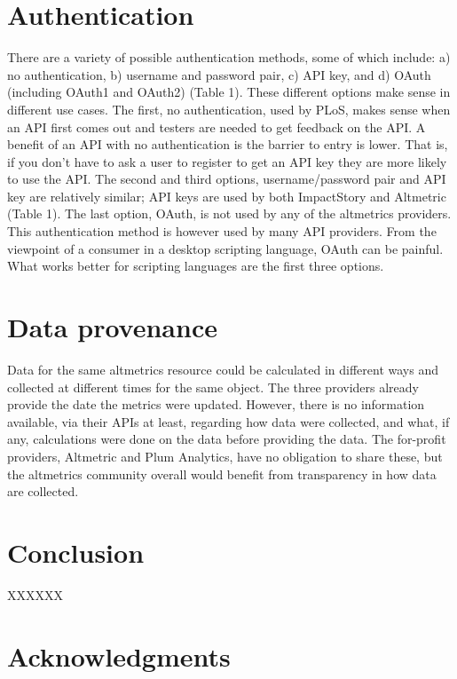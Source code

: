 \documentclass[letterpaper,superscriptaddress,showkeys,longbibliography]{revtex4-1}\usepackage{graphicx, color}
\begin{document}
\section{Authentication}

There are a variety of possible authentication methods, some of which include: a) no authentication, b) username and password pair, c) API key, and d) OAuth (including OAuth1 and OAuth2) (Table 1). These different options make sense in different use cases. The first, no authentication, used by PLoS, makes sense when an API first comes out and testers are needed to get feedback on the API. A benefit of an API with no authentication is the barrier to entry is lower. That is, if you don't have to ask a user to register to get an API key they are more likely to use the API. The second and third options, username/password pair and API key are relatively similar; API keys are used by both ImpactStory and Altmetric (Table 1). The last option, OAuth, is not used by any of the altmetrics providers. This authentication method is however used by many API providers. From the viewpoint of a consumer in a desktop scripting language, OAuth can be painful. What works better for scripting languages are the first three options.  

\section{Data provenance}

Data for the same altmetrics resource could be calculated in different ways and collected at different times for the same object. The three providers already provide the date the metrics were updated. However, there is no information available, via their APIs at least, regarding how data were collected, and what, if any, calculations were done on the data before providing the data. The for-profit providers, Altmetric and Plum Analytics, have no obligation to share these, but the altmetrics community overall would benefit from transparency in how data are collected. 

\section{Conclusion}

XXXXXX

\section{Acknowledgments}
\end{document}
